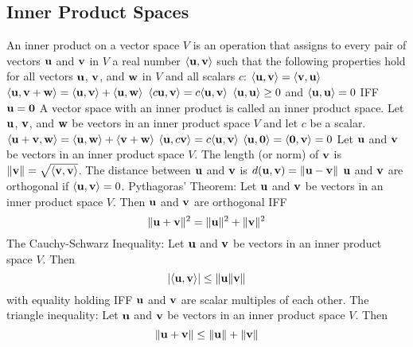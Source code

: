 \documentclass{article}
\begin{document}
        \subsection{Inner Product Spaces} 
        \begin{outline}
            \1 An inner product on a vector space $V$ is an operation that assigns to every pair of vectors \(\vb u\) and \(\vb v\) in $V$ a real number \(\langle\vb u,\vb v\rangle\) such that the following properties hold for all vectors \(\vb u\), \(\vb v\), and \(\vb w\) in $V$ and all scalars $c$:
                \2 \(\langle\vb u,\vb v\rangle=\langle\vb v,\vb u\rangle\)
                \2 \(\langle\vb u,\vb v+\vb w\rangle=\langle\vb u,\vb v\rangle+\langle\vb u,\vb w\rangle\)
                \2 \(\langle c\vb u,\vb v\rangle=c\langle\vb u,\vb v\rangle\)
                \2 \(\langle\vb u,\vb u\rangle\geq 0\) and \(\langle\vb u,\vb u\rangle=0\) IFF \(\vb u=\vb 0\)
            \1 A vector space with an inner product is called an inner product space. 
            \1 Let \(\vb u\), \(\vb v\), and \(\vb w\) be vectors in an inner product space $V$ and let \(c\) be a scalar. 
                \2 \(\langle\vb u+\vb v,\vb w\rangle=\langle\vb u,\vb w\rangle+\langle\vb v+\vb w\rangle\)
                \2 \(\langle\vb u,c\vb v\rangle=c\langle\vb u,\vb v\rangle\)
                \2 \(\langle\vb u,\vb 0\rangle=\langle\vb 0,\vb v\rangle=0\)
            \1 Let \(\vb u\) and \(\vb v\) be vectors in an inner product space $V$. 
                \2 The length (or norm) of \(\vb v\) is \(\|\vb v\|=\sqrt{\langle\vb v,\vb v\rangle}\). 
                \2 The distance between \(\vb u\) and \(\vb v\) is \(d(\vb u,\vb v)=\|\vb u-\vb v\|\)
                \2 \(\vb u\) and \(\vb v\) are orthogonal if \(\langle\vb u,\vb v\rangle=0\). 
            \1 Pythagoras' Theorem: Let \(\vb u\) and \(\vb v\) be vectors in an inner product space $V$. Then \(\vb u\) and \(\vb v\) are orthogonal IFF \[\|\vb u+\vb v\|^2=\|\vb u\|^2+\|\vb v\|^2\]
            \1 The Cauchy-Schwarz Inequality: Let \(\vb u\) and \(\vb v\) be vectors in an inner product space $V$. Then \[|\langle\vb u,\vb v\rangle|\leq\|\vb u\\\|\vb v\|\] with equality holding IFF $\vb u$ and $\vb v$ are scalar multiples of each other. 
        \1 The triangle inequality: Let $\vb u$ and $\vb v$ be vectors in an inner product space $V$. Then \[\|\vb u+\vb v\|\leq\|\vb u\|+\|\vb v\|\]
        \end{outline}
\end{document}
